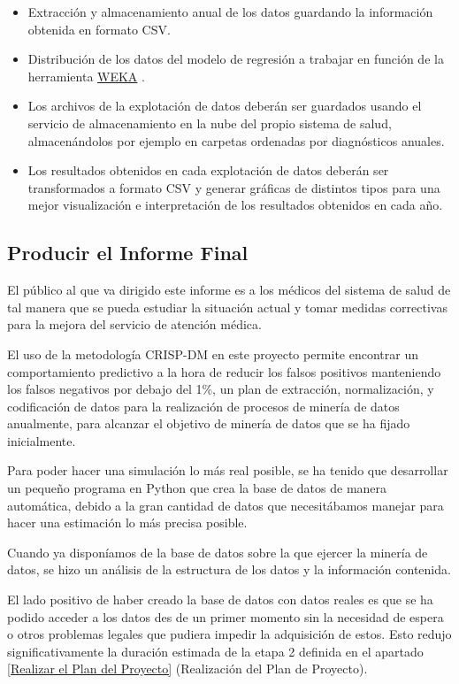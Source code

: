 \documentclass{article}
\begin{document}
\begin{itemize}
	\item Extracción y almacenamiento anual de los datos guardando la información obtenida en formato CSV.
	\item Distribución de los datos del modelo de regresión a trabajar en función de la herramienta \href{https://www.cs.waikato.ac.nz/~ml/weka/}{WEKA} .
	\item Los archivos de la explotación de datos deberán ser guardados usando el servicio de almacenamiento en la nube del propio sistema de salud, almacenándolos por ejemplo en carpetas ordenadas por diagnósticos anuales.
	\item Los resultados obtenidos en cada explotación de datos deberán ser transformados a formato CSV y generar gráficas de distintos tipos para una mejor visualización e interpretación de los resultados obtenidos en cada año.
\end{itemize}

\subsection{Producir el Informe Final}
El público al que va dirigido este informe es a los médicos del sistema de salud de tal manera que se pueda estudiar la situación actual y tomar medidas correctivas para la mejora del servicio de atención médica. 

El uso de la metodología CRISP-DM en este proyecto permite encontrar un comportamiento predictivo a la hora de reducir los falsos positivos manteniendo los falsos negativos por debajo del 1\%, un plan de extracción, normalización, y codificación de datos para la realización de procesos de minería de datos anualmente, para alcanzar el objetivo de minería de datos que se ha fijado inicialmente.

Para poder hacer una simulación lo más real posible, se ha tenido que desarrollar un pequeño programa en Python que crea la base de datos de manera automática, debido a la gran cantidad de datos que necesitábamos manejar para hacer una estimación lo más precisa posible.

Cuando ya disponíamos de la base de datos sobre la que ejercer la minería de datos, se hizo un análisis de la estructura de los datos y la información contenida.

El lado positivo de haber creado la base de datos con datos reales es que se ha podido acceder a los datos des de un primer momento sin la necesidad de espera o otros problemas legales que pudiera impedir la adquisición de estos. Esto redujo significativamente la duración estimada de la etapa 2 definida en el apartado \ref{Realizar el Plan del Proyecto} (Realización del Plan de Proyecto).
\end{document}
